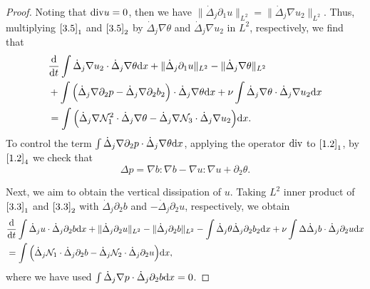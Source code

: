 \documentclass[reqno]{amsart}
\begin{document}
\begin{proof}
Noting that ${\rm div}u=0$, then we have
$\|\dot{\Delta}_j\partial_1u\|_{L^2}=\|\dot{\Delta}_j\nabla u_2\|_{L^2}$.
Thus, multiplying $\eqref{3.5}_1$ and $\eqref{3.5}_2$ by
$\dot{\Delta}_j\nabla\theta$ and $\dot{\Delta}_j\nabla u_2$ in $L^2$, respectively,
we find that
\begin{equation}\label{3.6}
\begin{aligned}
&\frac{\rm d}{{\rm d}t}\int\dot{\Delta}_j\nabla u_2\cdot\dot{\Delta}_j\nabla\theta
{\rm d}x +\|\dot{\Delta}_j\partial_1 u\|_{L^2}-\|\dot{\Delta}_j\nabla \theta\|_{L^2}\\
&+\int\Big(\dot{\Delta}_j\nabla\partial_2p-\dot{\Delta}_j\nabla\partial_2b_2\Big)
 \cdot\dot{\Delta}_j\nabla\theta{\rm d}x
 +\nu\int\dot{\Delta}_j\nabla\theta\cdot\dot{\Delta}_j\nabla u_2{\rm d}x \\
&=\int\Big(\dot{\Delta}_j\nabla \mathcal{N}_1^2\cdot\dot{\Delta}_j\nabla\theta
 -\dot{\Delta}_j\nabla\mathcal{N}_3\cdot\dot{\Delta}_j\nabla u_2\Big){\rm d}x.
\end{aligned}
\end{equation}
To control the term $\int\dot{\Delta}_j\nabla\partial_2p\cdot\dot{\Delta}_j
 \nabla\theta{\rm d}x$, applying the operator ${\rm div}$ to $\eqref{1.2}_1$, by
$\eqref{1.2}_4$ we check that
\begin{equation}\label{3.7}
 \Delta p=\nabla b:\nabla b-\nabla u:\nabla u+\partial_2\theta.
\end{equation}

Next, we aim to obtain the vertical dissipation of $u$. Taking $L^2$ inner product of
$\eqref{3.3}_1$ and $\eqref{3.3}_2$ with $\dot{\Delta}_j\partial_2b$ and
$-\dot{\Delta}_j\partial_2u$, respectively, we obtain
\begin{equation}\label{3.8}
\begin{aligned}
&\frac{\rm d}{{\rm d}t}\int\dot{\Delta}_j u\cdot\dot{\Delta}_j\partial_2b{\rm d}x
 +\|\dot{\Delta}_j\partial_2 u\|_{L^2}-\|\dot{\Delta}_j\partial_2b\|_{L^2}
 -\int\dot{\Delta}_j\theta\dot{\Delta}_j\partial_2b_2{\rm d}x
 +\nu\int\Delta\dot{\Delta}_jb\cdot\dot{\Delta}_j\partial_2 u{\rm d}x \\
&=\int\Big(\dot{\Delta}_j \mathcal{N}_1\cdot\dot{\Delta}_j\partial_2b
 -\dot{\Delta}_j\mathcal{N}_2\cdot\dot{\Delta}_j\partial_2 u\Big){\rm d}x,
\end{aligned}
\end{equation}
where we have used $\int\dot{\Delta}_j\nabla p\cdot\dot{\Delta}_j\partial_2b{\rm d}x=0$.


\end{proof}
\end{document}
